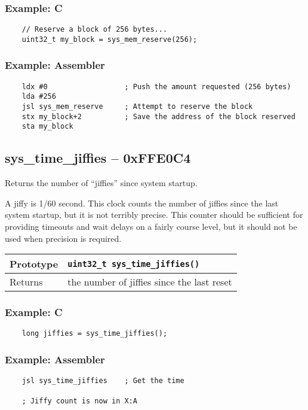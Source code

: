 \subsubsection*{Example: C}
\begin{lstlisting}
    // Reserve a block of 256 bytes...
    uint32_t my_block = sys_mem_reserve(256);    
\end{lstlisting}

\subsubsection*{Example: Assembler}
\begin{verbatim}
    ldx #0                  ; Push the amount requested (256 bytes)
    lda #256
    jsl sys_mem_reserve     ; Attempt to reserve the block
    stx my_block+2          ; Save the address of the block reserved
    sta my_block
\end{verbatim}

\subsection*{sys\_time\_jiffies -- 0xFFE0C4}
Returns the number of ``jiffies'' since system startup.

A jiffy is 1/60 second. This clock counts the number of jiffies since the last system startup, but it is not terribly precise.
This counter should be sufficient for providing timeouts and wait delays on a fairly course level, but it should not be used when precision is required.

\bigskip

\begin{tabular}{|l||l|} \hline
Prototype & \lstinline!uint32_t sys_time_jiffies()! \\ \hline
Returns & the number of jiffies since the last reset \\ \hline
\end{tabular}

\subsubsection*{Example: C}
\begin{lstlisting}
    long jiffies = sys_time_jiffies();
\end{lstlisting}

\subsubsection*{Example: Assembler}
\begin{verbatim}
    jsl sys_time_jiffies    ; Get the time

    ; Jiffy count is now in X:A
\end{verbatim}

